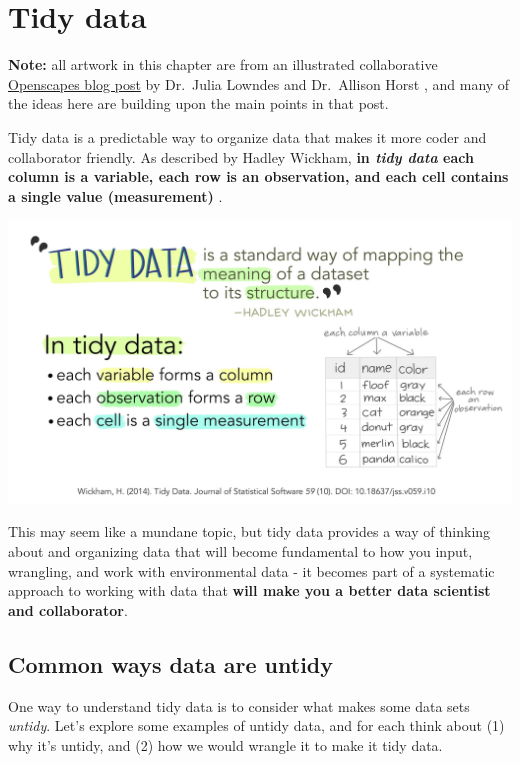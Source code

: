 \documentclass[
]{book}
\begin{document}
\hypertarget{tidydata}{%
\chapter{Tidy data}\label{tidydata}}

\textbf{Note:} all artwork in this chapter are from an illustrated collaborative \href{https://www.openscapes.org/blog/2020/10/12/tidy-data/}{Openscapes blog post} by Dr.~Julia Lowndes and Dr.~Allison Horst \citep{lowndes_tidy_2020}, and many of the ideas here are building upon the main points in that post.

Tidy data is a predictable way to organize data that makes it more coder and collaborator friendly. As described by Hadley Wickham, \textbf{in \emph{tidy data} each column is a variable, each row is an observation, and each cell contains a single value (measurement)} \citep{wickham_tidy_2014}.

\includegraphics[width=6.25in,height=\textheight]{images/tidydata_1.jpg}

This may seem like a mundane topic, but tidy data provides a way of thinking about and organizing data that will become fundamental to how you input, wrangling, and work with environmental data - it becomes part of a systematic approach to working with data that \textbf{will make you a better data scientist and collaborator}.

\hypertarget{common-ways-data-are-untidy}{%
\section{Common ways data are untidy}\label{common-ways-data-are-untidy}}

One way to understand tidy data is to consider what makes some data sets \emph{untidy}. Let's explore some examples of untidy data, and for each think about (1) why it's untidy, and (2) how we would wrangle it to make it tidy data.
\end{document}
